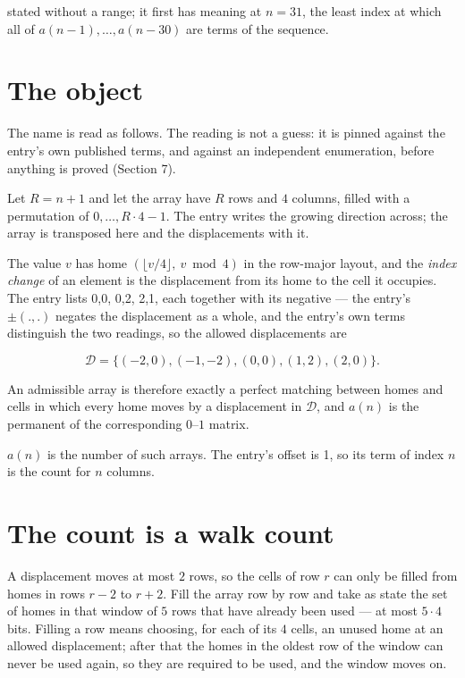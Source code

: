 \documentclass[11pt]{article}
\theoremstyle{definition}
\begin{document}
stated without a range; it first has meaning at $n = 31$, the least index at which all of $a(n-1),\dots,a(n-30)$ are terms of the sequence.

\section{The object}

The name is read as follows. The reading is not a guess: it is pinned against the entry's own published terms, and against an independent enumeration, before anything is proved (Section 7).

Let $R = n + 1$ and let the array have $R$ rows and $4$ columns, filled with a permutation of $0,\dots,R\cdot4-1$. The entry writes the growing direction across; the array is transposed here and the displacements with it.

The value $v$ has home $(\lfloor v/4\rfloor,\ v \bmod 4)$ in the row-major layout, and the {\itshape index change} of an element is the displacement from its home to the cell it occupies. The entry lists 0,0, 0,2, 2,1, each together with its negative --- the entry's $\pm(.,.)$ negates the displacement as a whole, and the entry's own terms distinguish the two readings, so the allowed displacements are

\[\mathcal{D} = \{(-2,0), (-1,-2), (0,0), (1,2), (2,0)\}.\]

An admissible array is therefore exactly a perfect matching between homes and cells in which every home moves by a displacement in $\mathcal{D}$, and $a(n)$ is the permanent of the corresponding $0$--$1$ matrix.

$a(n)$ is the number of such arrays. The entry's offset is 1, so its term of index $n$ is the count for $n$ columns.

\section{The count is a walk count}

A displacement moves at most $2$ rows, so the cells of row $r$ can only be filled from homes in rows $r-2$ to $r+2$. Fill the array row by row and take as state the set of homes in that window of $5$ rows that have already been used --- at most $5\cdot4$ bits. Filling a row means choosing, for each of its $4$ cells, an unused home at an allowed displacement; after that the homes in the oldest row of the window can never be used again, so they are required to be used, and the window moves on.
\end{document}
